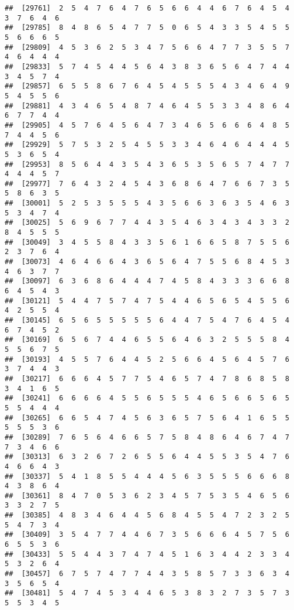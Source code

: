 \documentclass[
]{book}
\begin{document}
\begin{verbatim}
##  [29761]  2  5  4  7  6  4  7  6  5  6  6  4  4  6  7  6  4  5  4  3  7  6  4  6
##  [29785]  8  4  8  6  5  4  7  7  5  0  6  5  4  3  3  5  4  5  5  5  6  6  6  5
##  [29809]  4  5  3  6  2  5  3  4  7  5  6  6  4  7  7  3  5  5  7  4  6  4  4  4
##  [29833]  5  7  4  5  4  4  5  6  4  3  8  3  6  5  6  4  7  4  4  3  4  5  7  4
##  [29857]  6  5  5  8  6  7  6  4  5  4  5  5  5  4  3  4  6  4  9  5  4  5  5  6
##  [29881]  4  3  4  6  5  4  8  7  4  6  4  5  5  3  3  4  8  6  4  6  7  7  4  4
##  [29905]  4  5  7  6  4  5  6  4  7  3  4  6  5  6  6  6  4  8  5  7  4  4  5  6
##  [29929]  5  7  5  3  2  5  4  5  5  3  3  4  6  4  6  4  4  4  5  5  3  6  5  4
##  [29953]  8  5  6  4  4  3  5  4  3  6  5  3  5  6  5  7  4  7  7  4  4  4  5  7
##  [29977]  7  6  4  3  2  4  5  4  3  6  8  6  4  7  6  6  7  3  5  5  8  6  3  5
##  [30001]  5  2  5  3  5  5  5  4  3  5  6  6  3  6  3  5  4  6  3  5  3  4  7  4
##  [30025]  5  6  9  6  7  7  4  4  3  5  4  6  3  4  3  4  3  3  2  8  4  5  5  5
##  [30049]  3  4  5  5  8  4  3  3  5  6  1  6  6  5  8  7  5  5  6  2  3  7  6  4
##  [30073]  4  6  4  6  6  4  3  6  5  6  4  7  5  5  6  8  4  5  3  4  6  3  7  7
##  [30097]  6  3  6  8  6  4  4  4  7  4  5  8  4  3  3  3  6  6  8  6  4  5  4  3
##  [30121]  5  4  4  7  5  7  4  7  5  4  4  6  5  6  5  4  5  5  6  4  2  5  5  4
##  [30145]  6  5  6  5  5  5  5  5  6  4  4  7  5  4  7  6  4  5  4  6  7  4  5  2
##  [30169]  6  5  6  7  4  4  6  5  5  6  4  6  3  2  5  5  5  8  4  5  5  6  7  5
##  [30193]  4  5  5  7  6  4  4  5  2  5  6  6  4  5  6  4  5  7  6  3  7  4  4  3
##  [30217]  6  6  6  4  5  7  7  5  4  6  5  7  4  7  8  6  8  5  8  3  4  1  6  5
##  [30241]  6  6  6  6  4  5  5  6  5  5  5  4  6  5  6  6  5  6  5  5  5  4  4  4
##  [30265]  6  6  5  4  7  4  5  6  3  6  5  7  5  6  4  1  6  5  5  5  5  5  3  6
##  [30289]  7  6  5  6  4  6  6  5  7  5  8  4  8  6  4  6  7  4  7  7  3  4  6  6
##  [30313]  6  3  2  6  7  2  6  5  5  6  4  4  5  5  3  5  4  7  6  4  6  6  4  3
##  [30337]  5  4  1  8  5  5  4  4  4  5  6  3  5  5  5  6  6  6  8  4  3  8  6  4
##  [30361]  8  4  7  0  5  3  6  2  3  4  5  7  5  3  5  4  6  5  6  3  3  2  7  5
##  [30385]  4  8  3  4  6  4  4  5  6  8  4  5  5  4  7  2  3  2  5  5  4  7  3  4
##  [30409]  3  5  4  7  7  4  4  6  7  3  5  6  6  6  4  5  7  5  6  6  5  5  3  6
##  [30433]  5  5  4  4  3  7  4  7  4  5  1  6  3  4  4  2  3  3  4  5  3  2  6  4
##  [30457]  6  7  5  7  4  7  7  4  4  3  5  8  5  7  3  3  6  3  4  3  5  6  5  4
##  [30481]  5  4  7  4  5  3  4  4  6  5  3  8  3  2  7  3  5  7  3  5  5  3  4  5

\end{verbatim}
\end{document}
